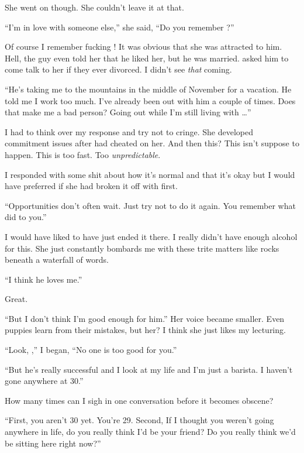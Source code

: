 She went on though.  She couldn't leave it at that.
\VV


``I'm in love with someone else,'' she said,
``Do you remember \crosby?''
\VV


\noindent
Of course I remember fucking \crosby!
It was obvious that she was attracted to him.
Hell, the guy even told her that he liked her, but
he was married.
\april{} asked him to come talk to her if they ever divorced.
I didn't see \textit{that} coming.
\VV


``He's taking me to the mountains in the middle of November for a vacation.
He told me I work too much.
I've already been out with him a couple of times.
Does that make me a bad person?
Going out while I'm still living with \eric\ldots''
\VV


\noindent
I had to think over my response and try not to cringe.
She developed commitment issues after \blake{} had cheated on her.
And then this?  This isn't suppose to happen.
This is too fast.  Too \textit{unpredictable}.


I responded with some shit about how it's normal and that it's okay
but I would have preferred if she had broken it off with \eric{} first.
\VV


``Opportunities don't often wait.
Just try not to do it again.
You remember what \blake{} did to you.''
\VV


\noindent
I would have liked to have just ended it there.
I really didn't have enough alcohol for this.
She just constantly bombards me with these trite matters
like rocks beneath a waterfall of words.
\VV


``I think he loves me.''
\VV


\noindent
Great.
\VV


``But I don't think I'm good enough for him.''
Her voice became smaller.
Even puppies learn from their mistakes, but her?
I think she just likes my lecturing.


``Look, \april{},'' I began,
``No one is too good for you.''


``But he's really successful and
I look at my life and I'm just a barista.
I haven't gone anywhere at 30.''
\VV


\noindent
How many times can I sigh in one conversation before it becomes obscene?
\VV

``First, you aren't 30 yet. You're 29.
Second, If I thought you weren't going anywhere in life,
do you really think I'd be your friend?
Do you really think we'd be sitting here right now?''
\VV


